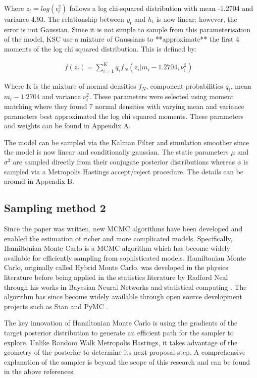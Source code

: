 \documentclass[12pt, a4paper]{article}
\begin{document}
        Where $z_t = log(\epsilon_t^2)$ follows a log chi-squared distribution with mean -1.2704 and variance 4.93. The relationship between $y_t$ and $h_t$ is now linear; however, the error is not Gaussian. Since it is not simple to sample from this parameterisation of the model, KSC use a mixture of Gaussians to **approximate** the first 4 moments of the log chi squared distribution. This is defined by:

        $$
        \begin{aligned}
        f(z_t) = \sum_{i=1}^{K} q_if_N(z_i|m_i-1.2704, \nu_i^2)
        \end{aligned}
        $$

        Where K is the mixture of normal densities $f_N$, component probabilities $q_i$, mean $m_i-1.2704$ and variance $\nu_i^2$. These parameters were selected using moment matching where they found 7 normal densities with varying mean and variance parameters best approximated the log chi squared moments. These parameters and weights can be found in Appendix A.

        The model can be sampled via the Kalman Filter and simulation smoother since the model is now linear and conditionally gaussian. The static parameters $\mu$ and $\sigma^2$ are sampled directly from their conjugate posterior distributions whereas $\phi$ is sampled via a Metropolis Hastings accept/reject procedure. The details can be around in Appendix B. 

    \subsection{Sampling method 2}
        Since the paper was written, new MCMC algorithms have been developed and enabled the estimation of richer and more complicated models. Specifically, Hamiltonian Monte Carlo is a MCMC algorithm which has become widely available for efficiently sampling from sophisticated models. Hamiltonian Monte Carlo, originally called Hybrid Monte Carlo, was developed in the physics literature \citep{duane1987hybrid} before being applied in the statistics literature by Radford Neal through his works in Bayesian Neural Networks \citep{neal1995bayesian} and statistical computing \citep{neal2011mcmc}. The algorithm has since become widely available through open source development projects such as Stan \citep{stan} and PyMC \citep{pymc2023}.

        The key innovation of Hamiltonian Monte Carlo is using the gradients of the target posterior distribution to generate an efficient path for the sampler to explore. Unlike Random Walk Metropolis Hastings, it takes advantage of the geometry of the posterior to determine its next proposal step. A comprehensive explanation of the sampler is beyond the scope of this research and can be found in the above references. 
\end{document}
